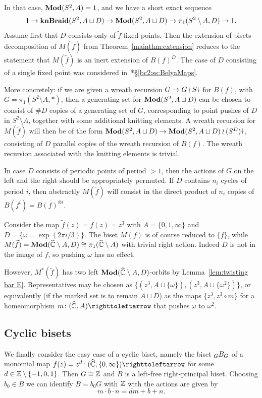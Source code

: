 \documentclass{amsart}
\newcommand\knBraid{{\mathbf{knBraid}}}
\newcommand\wtf{{\widetilde f}}
\begin{document}
In that case, $\mathbf{\relax Mod}(S^2,A)=1$, and we have a short exact sequence
\[1\to\knBraid(S^2,A\sqcup D)\to\Mod(S^2,A\sqcup D)\to\pi_1(S^2\setminus A,D)\to1.
\]
Assume first that $D$ consists only of $\wtf$-fixed
points. Then the extension of bisets decomposition of
$M(\wtf)$ from Theorem~\ref{mainthm:extension} reduces to the
statement that $M(\wtf)$ is an inert extension of
$B(f)^D$. The case of $D$ consisting of a single fixed point was
considered in~\cite{bartholdi-dudko:bc2}*{\S\ref{bc2:ss:BelyaMaps}}.

More concretely: if we are given a wreath recursion $G\to G\wr S{\stackrel{\downarrow}{\smash.}}$
for $B(f)$, with $G=\pi_1(S^2\setminus A,*)$, then a generating set
for $\mathbf{\relax Mod}(S^2,A\sqcup D)$ can be chosen to consist of $\#D$ copies of
a generating set of $G$, corresponding to point pushes of $D$ in
$S^2\setminus A$, together with some additional knitting elements. A
wreath recursion for $M(\wtf)$ will then be of the form
$\mathbf{\relax Mod}(S^2,A\sqcup D)\to\mathbf{\relax Mod}(S^2,A\sqcup D)\wr (S^D){\stackrel{\downarrow}{\smash.}}$, consisting
of $D$ parallel copies of the wreath recursion of $B(f)$. The wreath
recursion associated with the knitting elements is trivial.

In case $D$ consists of periodic points of period $>1$, then the
actions of $G$ on the left and the right should be appropriately
permuted. If $D$ contains $n_i$ cycles of period $i$, then abstractly
$M(\wtf)$ will consist in the direct product of $n_i$ copies
of $B(f^i)=B(f)^{\otimes i}$.

\begin{exple}\label{ex:M*neqM}
  Consider the map $\wtf(z)=f(z)=z^3$ with $A=\{0,1,\infty\}$ and
  $D=\{\omega=\exp(2\pi i/3)\}$. The biset $M(f)$ is of course reduced
  to $\{f\}$, while
  $M(\wtf)=\Mod(\widehat\C\setminus A,D)\cong\pi_1(\widehat\C\setminus
  A)$ with trivial right action. Indeed $D$ is not in the image of
  $f$, so pushing $\omega$ has no effect.

  However, $M^*(\wtf)$ has two left
  $\mathbf{\relax Mod}(\widehat{{\mathbb C}}\setminus A,D)$-orbits by Lemma~\ref{lem:twisting bar E}. Representatives may be
  chosen as $\{(z^3,A\sqcup\{\omega\}),(z^3,A\sqcup\{\omega^2\})\}$,
  or equivalently (if the marked set is to remain $A\sqcup D$) as the
  maps $\{z^3,z^3\circ m\}$ for a homeomorphism
  $m\colon(\widehat\C,A)\selfmap$ that pushes $\omega$ to $\omega^2$.
\end{exple}

\subsection{Cyclic bisets}
\label{ss:CyclBis}
We finally consider the easy case of a cyclic biset, namely the biset
$\subscript G B_G$ of a monomial map
$f(z)=z^d\colon(\widehat\C,\{0,\infty\})\selfmap$ for some
$d\in{\mathbb Z}\setminus\{-1,0,1\}$. Then $G\cong{\mathbb Z}$ and $B$ is a left-free
right-principal biset. Choosing $b_0\in B$ we can identify $B=b_0G$
with ${\mathbb Z}$ with the actions are given by
\[m\cdot b\cdot n=d m+b+n.\]
\end{document}
